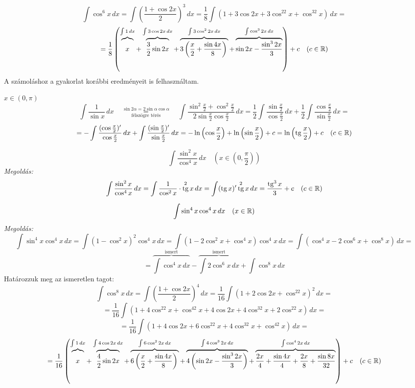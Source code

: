 \documentclass[a4paper,11.5pt]{article}
\DeclareMathOperator{\tg}{tg}
\begin{document}
	\begin{exercise}
		\def\fracHeight{\vphantom{\frac{3^2}{2}}}
		\[\int\cos^6x\,dx=\int\left(\frac{1+\cos2x}{2}\right)^3\,dx=\frac{1}{8}\int(1+3\cos2x+3\cos^22x+\cos^32x)\,dx=\]
		\[= \frac{1}{8}\left(\overbrace{x\fracHeight}^{\int1\,dx}+\overbrace{\frac{3}{2}\sin2x\fracHeight}^{\int3\cos2x\,dx}+ \overbrace{3\left(\frac{x}{2}+\frac{\sin4x}{8}\right)\fracHeight}^{\int3\cos^22x\,dx}+ \overbrace{\sin2x-\frac{\sin^32x}{3}}^{\int\cos^32x\,dx}\right)+c\quad (c\in\R)  \]
		A számoláshoz a gyakorlat korábbi eredményeit is felhasználtam.
	\end{exercise}
	\begin{task}$x\in(0,\pi)$
		\[\int\frac{1}{\sin x}\,dx\quad \overset{\sin2\alpha=2\sin\alpha\cos\alpha}{\underset{\text{félszögre térés}}{=}}\quad \int\frac{\sin^2\frac{x}{2}+\cos^2\frac{x}{2}}{2\sin\frac{x}{2}\cos\frac{x}{2}}\,dx=\frac{1}{2}\int\frac{\sin\frac{x}{2}}{\cos\frac{x}{2}}\,dx+\frac{1}{2}\int\frac{\cos\frac{x}{2}}{\sin\frac{x}{2}}\,dx=\]
		\[=-\int\frac{(\cos\frac{x}{2})'}{\cos\frac{x}{2}}\,dx+\int\frac{(\sin\frac{x}{2})'}{\sin\frac{x}{2}}\,dx=-\ln\left(\cos\frac{x}{2}\right)+\ln\left(\sin\frac{x}{2}\right)+c=\ln\left(\tg\frac{x}{2}\right)+c\quad (c\in\R) \]
	\end{task}
	\begin{exercise}
		\[ \int\frac{\sin^2x}{\cos^4x}\,dx\quad \left(x\in\left(0,\frac{\pi}{2}\right)\right) \]
		\textit{Megoldás:}
		\[ \int\frac{\sin^2x}{\cos^4x}\,dx=\int\frac{1}{\cos^2x}\cdot\tg^2x\,dx= \int(\tg x)'\tg^2x\,dx=\frac{\tg^3x}{3}+c\quad (c\in\R) \]
	\end{exercise}
	\begin{exercise}
		\[ \int\sin^4x\cos^4x\,dx \quad (x\in\mathbb{R}) \]
		\textit{Megoldás:}
		\[ \int\sin^4x\cos^4x\,dx=\int(1-\cos^2x)^2\cos^4x\,dx=\int(1-2\cos^2x+\cos^4x)\cos^4x\,dx=\int(\cos^4x-2\cos^6x+\cos^8x)\,dx=\]
		\[ =\overbrace{\int\cos^4x\,dx}^{\text{ismert}}-\overbrace{\int2\cos^6x\,dx}^{\text{ismert}}+\int\cos^8x\,dx \]
		Határozzuk meg az ismeretlen tagot:
		\[ \int\cos^8x\,dx=\int\left(\frac{1+\cos2x}{2}\right)^4\,dx=\frac{1}{16}\int(1+2\cos2x+\cos^22x)^2\,dx=\]
		\[=\frac{1}{16}\int\left(1+4\cos^22x+\cos^42x+4\cos2x+4\cos^32x+2\cos^22x\right)\,dx=\]
		\[=\frac{1}{16}\int\left(1+4\cos2x+6\cos^22x+4\cos^32x+\cos^42x\right)\,dx=\]
		\def\fracHeight{\vphantom{\frac{3^2}{2}}}
		\[= \frac{1}{16}\left(\overbrace{x\fracHeight}^{\int1\,dx}+\overbrace{\frac{4}{2}\sin2x\fracHeight}^{\int4\cos2x\,dx}+ \overbrace{6\left(\frac{x}{2}+\frac{\sin4x}{8}\right)\fracHeight}^{\int6\cos^22x\,dx}+ \overbrace{4\left(\sin2x-\frac{\sin^32x}{3}\right)}^{\int4\cos^32x\,dx}+\overbrace{\frac{2x}{4}+\frac{\sin4x}{4}+\frac{2x}{8}+\frac{\sin8x}{32}\fracHeight}^{\int\cos^42x\,dx}\right)+c\quad (c\in\R)  \]
	\end{exercise}
\end{document}
